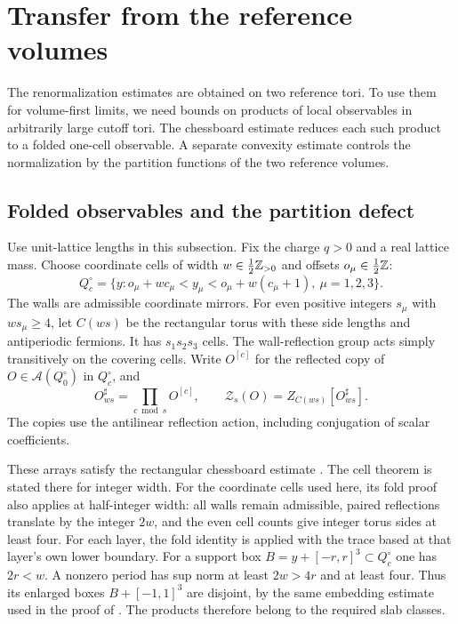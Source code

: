 \section{Transfer from the reference volumes}\label{sec:uniform-transfer}

The renormalization estimates are obtained on two reference tori.
To use them for volume-first limits, we need bounds on products
of local observables in arbitrarily large cutoff tori. The
chessboard estimate reduces each such product to a folded
one-cell observable. A separate convexity estimate controls
the normalization by the partition functions of the two
reference volumes.

\subsection{Folded observables and the partition defect}

Use unit-lattice lengths in this subsection. Fix the charge $q>0$
and a real lattice mass. Choose coordinate cells of width
$w\in\tfrac12\mathbb Z_{>0}$ and offsets $o_\mu\in\tfrac12\mathbb Z$:
\[
 Q_c^\circ=\{y:o_\mu+wc_\mu<y_\mu<o_\mu+w(c_\mu+1),\
                           \mu=1,2,3\}.
\]
The walls are admissible coordinate mirrors. For even positive
integers $s_\mu$ with $ws_\mu\ge4$, let $C(ws)$ be the rectangular
torus with these side lengths and antiperiodic fermions.
It has $s_1s_2s_3$ cells. The wall-reflection group acts simply
transitively on the covering cells. Write $O^{[c]}$ for the
reflected copy of $O\in\mathcal A(Q_0^\circ)$ in $Q_c^\circ$,
and
\[
 O^\sharp_{ws}=\prod_{c\bmod s}O^{[c]},\qquad
 \mathcal Z_s(O)=Z_{C(ws)}[O^\sharp_{ws}].
\]
The copies use the antilinear reflection action, including
conjugation of scalar coefficients.

These arrays satisfy the rectangular chessboard estimate
\cite[(69)]{ChamberLattice}. The cell theorem is stated there for integer width.
For the coordinate cells used here, its fold proof also applies
at half-integer width: all walls remain admissible, paired
reflections translate by the integer $2w$, and the even cell
counts give integer torus sides at least four. For each layer, the fold
identity is applied with the trace based at that layer's own lower boundary.
For a support box $B=y+[-r,r]^3\subset Q_c^\circ$ one has
$2r<w$. A nonzero period has sup norm at least $2w>4r$
and at least four. Thus its enlarged boxes $B+[-1,1]^3$
are disjoint, by the same embedding estimate used in the
proof of \cite[Proposition~4.3]{ChamberLattice}.
The products therefore belong to the required slab classes.

